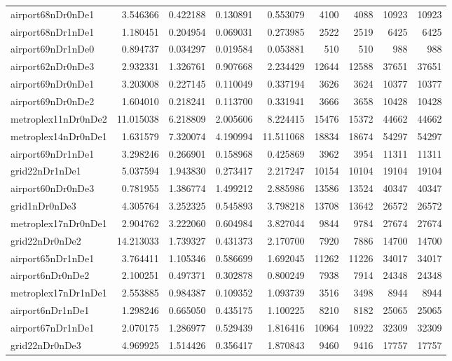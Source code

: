 \begin{longtable}{|l|r|r|r|r|r|r|r|r|}
airport68nDr0nDe1 & 3.546366 & 0.422188 & 0.130891 & 0.553079 & 4100 & 4088 & 10923 & 10923 \\
airport68nDr1nDe1 & 1.180451 & 0.204954 & 0.069031 & 0.273985 & 2522 & 2519 & 6425 & 6425 \\
airport69nDr1nDe0 & 0.894737 & 0.034297 & 0.019584 & 0.053881 & 510 & 510 & 988 & 988 \\
airport62nDr0nDe3 & 2.932331 & 1.326761 & 0.907668 & 2.234429 & 12644 & 12588 & 37651 & 37651 \\
airport69nDr0nDe1 & 3.203008 & 0.227145 & 0.110049 & 0.337194 & 3626 & 3624 & 10377 & 10377 \\
airport69nDr0nDe2 & 1.604010 & 0.218241 & 0.113700 & 0.331941 & 3666 & 3658 & 10428 & 10428 \\
metroplex11nDr0nDe2 & 11.015038 & 6.218809 & 2.005606 & 8.224415 & 15476 & 15372 & 44662 & 44662 \\
metroplex14nDr0nDe1 & 1.631579 & 7.320074 & 4.190994 & 11.511068 & 18834 & 18674 & 54297 & 54297 \\
airport69nDr1nDe1 & 3.298246 & 0.266901 & 0.158968 & 0.425869 & 3962 & 3954 & 11311 & 11311 \\
grid22nDr1nDe1 & 5.037594 & 1.943830 & 0.273417 & 2.217247 & 10154 & 10104 & 19104 & 19104 \\
airport60nDr0nDe3 & 0.781955 & 1.386774 & 1.499212 & 2.885986 & 13586 & 13524 & 40347 & 40347 \\
grid1nDr0nDe3 & 4.305764 & 3.252325 & 0.545893 & 3.798218 & 13708 & 13642 & 26572 & 26572 \\
metroplex17nDr0nDe1 & 2.904762 & 3.222060 & 0.604984 & 3.827044 & 9844 & 9784 & 27674 & 27674 \\
grid22nDr0nDe2 & 14.213033 & 1.739327 & 0.431373 & 2.170700 & 7920 & 7886 & 14700 & 14700 \\
airport65nDr1nDe1 & 3.764411 & 1.105346 & 0.586699 & 1.692045 & 11262 & 11226 & 34017 & 34017 \\
airport6nDr0nDe2 & 2.100251 & 0.497371 & 0.302878 & 0.800249 & 7938 & 7914 & 24348 & 24348 \\
metroplex17nDr1nDe1 & 2.553885 & 0.984387 & 0.109352 & 1.093739 & 3516 & 3498 & 8944 & 8944 \\
airport6nDr1nDe1 & 1.298246 & 0.665050 & 0.435175 & 1.100225 & 8210 & 8182 & 25065 & 25065 \\
airport67nDr1nDe1 & 2.070175 & 1.286977 & 0.529439 & 1.816416 & 10964 & 10922 & 32309 & 32309 \\
grid22nDr0nDe3 & 4.969925 & 1.514426 & 0.356417 & 1.870843 & 9460 & 9416 & 17757 & 17757 \\

\end{longtable}
